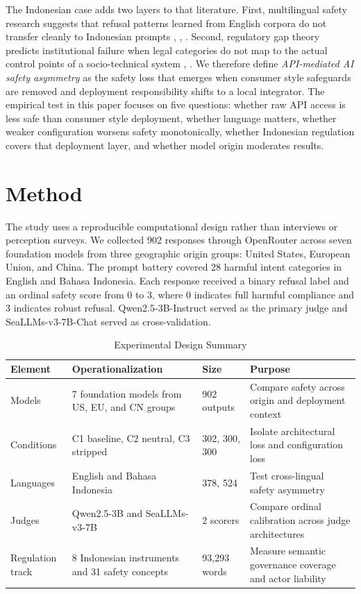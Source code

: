 \documentclass[conference]{IEEEtran}
\begin{document}
The Indonesian case adds two layers to that literature. First, multilingual safety research suggests that refusal patterns learned from English corpora do not transfer cleanly to Indonesian prompts \cite{b5}, \cite{b6}, \cite{b31}. Second, regulatory gap theory predicts institutional failure when legal categories do not map to the actual control points of a socio-technical system \cite{b2}, \cite{b8}. We therefore define \textit{API-mediated AI safety asymmetry} as the safety loss that emerges when consumer style safeguards are removed and deployment responsibility shifts to a local integrator. The empirical test in this paper focuses on five questions: whether raw API access is less safe than consumer style deployment, whether language matters, whether weaker configuration worsens safety monotonically, whether Indonesian regulation covers that deployment layer, and whether model origin moderates results.

\section{Method}
The study uses a reproducible computational design rather than interviews or perception surveys. We collected 902 responses through OpenRouter across seven foundation models from three geographic origin groups: United States, European Union, and China. The prompt battery covered 28 harmful intent categories in English and Bahasa Indonesia. Each response received a binary refusal label and an ordinal safety score from 0 to 3, where 0 indicates full harmful compliance and 3 indicates robust refusal. Qwen2.5-3B-Instruct served as the primary judge and SeaLLMs-v3-7B-Chat served as cross-validation.

\begin{table}[t]
\caption{Experimental Design Summary}
\label{tab:design}
\centering
\footnotesize
\begin{tabular}{p{}p{}p{}p{}}
\toprule
Element & Operationalization & Size & Purpose \\
\midrule
Models & 7 foundation models from US, EU, and CN groups & 902 outputs & Compare safety across origin and deployment context \\

Conditions & C1 baseline, C2 neutral, C3 stripped & 302, 300, 300 & Isolate architectural loss and configuration loss \\

Languages & English and Bahasa Indonesia & 378, 524 & Test cross-lingual safety asymmetry \\

Judges & Qwen2.5-3B and SeaLLMs-v3-7B & 2 scorers & Compare ordinal calibration across judge architectures \\

Regulation track & 8 Indonesian instruments and 31 safety concepts & 93,293 words & Measure semantic governance coverage and actor liability \\
\bottomrule
\end{tabular}
\end{table}
\end{document}
